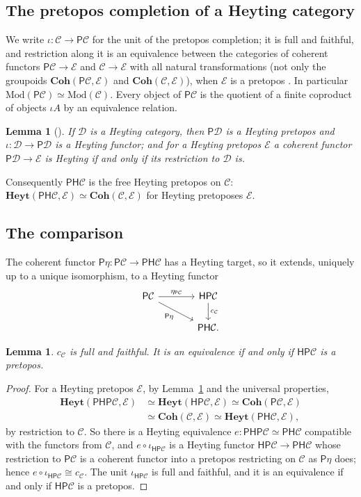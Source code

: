 \documentclass[11pt]{amsart}
\newtheorem{lem}[thm]{Lemma}
\theoremstyle{definition}
\newcommand{\Coh}{\mathbf{Coh}}
\newcommand{\Heyt}{\mathbf{Heyt}}
\newcommand{\Mod}{\mathrm{Mod}}
\newcommand{\PP}{\mathsf P}
\newcommand{\HH}{\mathsf H}
\newcommand{\cC}{\mathcal C}
\newcommand{\cD}{\mathcal D}
\begin{document}
\subsection*{The pretopos completion of a Heyting category}
We write $\iota\colon\cC\to\PP\cC$ for the unit of the pretopos
completion; it is full and faithful, and restriction along it is an
equivalence between the categories of coherent functors $\PP\cC\to
\mathcal E$ and $\cC\to\mathcal E$ with all natural transformations
(not only the groupoids $\Coh(\PP\cC,\mathcal E)$ and $\Coh(\cC,
\mathcal E)$), when $\mathcal E$ is a
pretopos \cite[A3.3]{Elephant}. In particular $\Mod(\PP\cC)\simeq
\Mod(\cC)$. Every object of $\PP\cC$ is the quotient of a finite
coproduct of objects $\iota A$ by an equivalence relation.

\begin{lem}[{\cite[Lemma~9.1]{Morley}}]\label{lem:PHeyt}
If $\cD$ is a Heyting category, then $\PP\cD$ is a Heyting pretopos and
$\iota\colon\cD\to\PP\cD$ is a Heyting functor; and for a Heyting
pretopos $\mathcal E$ a coherent functor $\PP\cD\to\mathcal E$ is
Heyting if and only if its restriction to $\cD$ is.
\end{lem}

Consequently $\PP\HH\cC$ is the free Heyting pretopos on $\cC$:
$\Heyt(\PP\HH\cC,\mathcal E)\simeq\Coh(\cC,\mathcal E)$ for Heyting
pretoposes $\mathcal E$.

\subsection*{The comparison}
The coherent functor $\PP\eta\colon\PP\cC\to\PP\HH\cC$ has a Heyting
target, so it extends, uniquely up to a unique isomorphism, to a
Heyting functor
\[
\begin{tikzcd}[column sep=large]
\PP\cC\arrow[r,"\eta_{\PP\cC}"]\arrow[dr,"\PP\eta"']&\HH\PP\cC
\arrow[d,"c_\cC"]\\
&\PP\HH\cC.
\end{tikzcd}
\]

\begin{lem}\label{lem:ff}
$c_\cC$ is full and faithful. It is an equivalence if and only if
$\HH\PP\cC$ is a pretopos.
\end{lem}
\begin{proof}
For a Heyting pretopos $\mathcal E$, by Lemma~\ref{lem:PHeyt} and the
universal properties,
\begin{align*}
\Heyt(\PP\HH\PP\cC,\mathcal E)&\simeq\Heyt(\HH\PP\cC,\mathcal E)\simeq
\Coh(\PP\cC,\mathcal E)\\&\simeq\Coh(\cC,\mathcal E)\simeq
\Heyt(\PP\HH\cC,\mathcal E),
\end{align*}
by restriction to $\cC$. So there is a Heyting equivalence $e\colon\PP
\HH\PP\cC\simeq\PP\HH\cC$ compatible with the functors from $\cC$, and
$e\circ\iota_{\HH\PP\cC}$ is a Heyting functor $\HH\PP\cC\to\PP\HH\cC$
whose restriction to $\PP\cC$ is a coherent functor into a pretopos
restricting on $\cC$ as $\PP\eta$ does; hence $e\circ\iota_{\HH\PP\cC}
\cong c_\cC$. The unit $\iota_{\HH\PP\cC}$ is full and faithful, and it
is an equivalence if and only if $\HH\PP\cC$ is a pretopos.
\end{proof}
\end{document}
